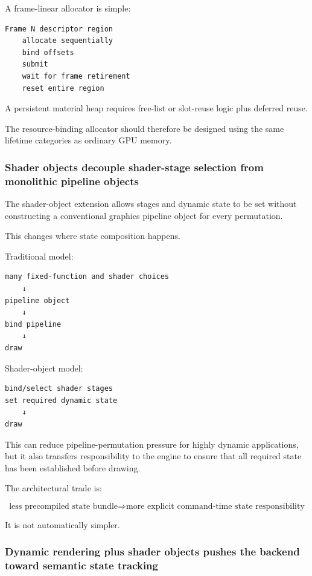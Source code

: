 A frame-linear allocator is simple:

\begin{verbatim}
Frame N descriptor region
    allocate sequentially
    bind offsets
    submit
    wait for frame retirement
    reset entire region
\end{verbatim}

A persistent material heap requires free-list or slot-reuse logic plus deferred reuse.

The resource-binding allocator should therefore be designed using the same lifetime categories as ordinary GPU memory.

\subsubsection{Shader objects decouple shader-stage selection from monolithic pipeline objects}\label{05-engine-i-ch023-shader-objects-decouple-shader-stage-selection-from-monolithic-pipeline-objects}

The shader-object extension allows stages and dynamic state to be set without constructing a conventional graphics pipeline object for every permutation.

This changes where state composition happens.

Traditional model:

\begin{verbatim}
many fixed-function and shader choices
    ↓
pipeline object
    ↓
bind pipeline
    ↓
draw
\end{verbatim}

Shader-object model:

\begin{verbatim}
bind/select shader stages
set required dynamic state
    ↓
draw
\end{verbatim}

This can reduce pipeline-permutation pressure for highly dynamic applications, but it also transfers responsibility to the engine to ensure that all required state has been established before drawing.

The architectural trade is:

\[
\boxed{
\text{less precompiled state bundle}
\Rightarrow
\text{more explicit command-time state responsibility}
}
\]

It is not automatically simpler.

\subsubsection{Dynamic rendering plus shader objects pushes the backend toward semantic state tracking}\label{05-engine-i-ch023-dynamic-rendering-plus-shader-objects-pushes-the-backend-toward-semantic-state-tracking}

